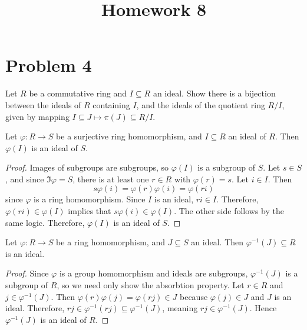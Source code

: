 \documentclass[11pt, letterpaper]{article}
\title{Homework 8}
\begin{document}
\makeproblem
\setcounter{section}{3}



\section{Problem 4}

\begin{problem}\label{4.1}
	Let $R$ be a commutative ring and $I\subseteq R$ an ideal. Show there is a bijection between the ideals of $R$ containing $I$, and the ideals of the quotient ring $R/I$, given by mapping $I \subseteq J\mapsto \pi (J) \subseteq R/I$.
\end{problem}
\begin{lemma}\label{lma1}
	Let $\varphi : R \to S$ be a surjective ring homomorphism, and $I\subseteq R$ an ideal of $R$. Then $\varphi (I)$ is an ideal of $S$.
\end{lemma}
\begin{proof}
	Images of subgroups are subgroups, so $\varphi (I)$ is a subgroup of $S$. Let $s\in S$, and since $\Im  \varphi =S$, there is at least one $r\in R$ with $\varphi (r)=s$. Let $i\in I$. Then
	\[
		s\varphi (i)=\varphi (r)\varphi (i)=\varphi (ri)
	\]
	since $\varphi $ is a ring homomorphism. Since $I$ is an ideal, $ri\in I$. Therefore, $\varphi (ri)\in \varphi (I)$ implies that $s\varphi (i)\in \varphi (I)$. The other side follows by the same logic. Therefore, $\varphi (I)$ is an ideal of $S$.
\end{proof}
\begin{lemma}\label{lma2}
	Let $\varphi : R \to S$ be a ring homomorphism, and $J\subseteq S$ an ideal. Then $\varphi ^{-1} (J)\subseteq R$ is an ideal.
\end{lemma}
\begin{proof}
	Since $\varphi $ is a group homomorphism and ideals are subgroups, $\varphi ^{-1} (J)$ is a subgroup of $R$, so we need only show the absorbtion property. Let $r\in R$ and $j\in \varphi ^{-1} (J)$. Then $\varphi (r)\varphi (j)=\varphi (rj)\in J$ because $\varphi (j)\in J$ and $J$ is an ideal. Therefore, $rj\in \varphi ^{-1} (rj)\subseteq \varphi ^{-1} (J)$, meaning $rj\in \varphi ^{-1} (J)$. Hence $\varphi ^{-1} (J)$ is an ideal of $R$.
\end{proof}
\end{document}

